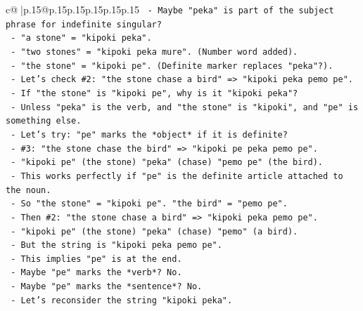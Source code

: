 \documentclass{article}
\begin{document}
{\begin{supertabular}{c@{$\;$}|p{.15\linewidth}@{}p{.15\linewidth}p{.15\linewidth}p{.15\linewidth}p{.15\linewidth}p{.15\linewidth}}
{{{\texttt{                        {-} Maybe "peka" is part of the subject phrase for indefinite singular?} \\
\texttt{                        {-} "a stone" = "kipoki peka".} \\
\texttt{                        {-} "two stones" = "kipoki peka mure". (Number word added).} \\
\texttt{                        {-} "the stone" = "kipoki pe". (Definite marker replaces "peka"?).} \\
\texttt{                        {-} Let's check \#2: "the stone chase a bird" => "kipoki peka pemo pe".} \\
\texttt{                          {-} If "the stone" is "kipoki pe", why is it "kipoki peka"?} \\
\texttt{                          {-} Unless "peka" is the verb, and "the stone" is "kipoki", and "pe" is something else.} \\
\texttt{                          {-} Let's try: "pe" marks the *object* if it is definite?} \\
\texttt{                          {-} \#3: "the stone chase the bird" => "kipoki pe peka pemo pe".} \\
\texttt{                            {-} "kipoki pe" (the stone) "peka" (chase) "pemo pe" (the bird).} \\
\texttt{                            {-} This works perfectly if "pe" is the definite article attached to the noun.} \\
\texttt{                            {-} So "the stone" = "kipoki pe". "the bird" = "pemo pe".} \\
\texttt{                            {-} Then \#2: "the stone chase a bird" => "kipoki peka pemo pe".} \\
\texttt{                              {-} "kipoki pe" (the stone) "peka" (chase) "pemo" (a bird).} \\
\texttt{                              {-} But the string is "kipoki peka pemo pe".} \\
\texttt{                              {-} This implies "pe" is at the end.} \\
\texttt{                              {-} Maybe "pe" marks the *verb*? No.} \\
\texttt{                              {-} Maybe "pe" marks the *sentence*? No.} \\
\texttt{                              {-} Let's reconsider the string "kipoki peka".} \\
}}}
\end{supertabular}}
\end{document}
